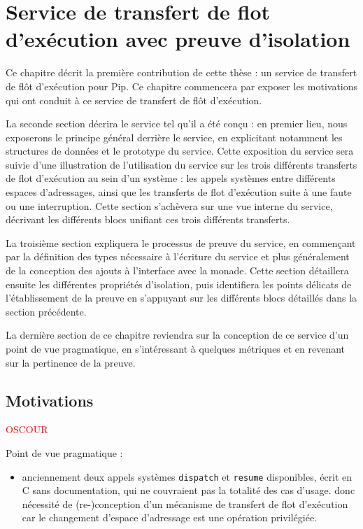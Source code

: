 \chapter{Service de transfert de flot d'exécution avec preuve d'isolation}

Ce chapitre décrit la première contribution de cette thèse : un service de transfert de flôt d'exécution pour Pip. Ce chapitre commencera par exposer les motivations qui ont conduit à ce service de transfert de flôt d'exécution.

La seconde section décrira le service tel qu'il a été conçu : en premier lieu, nous exposerons le principe général derrière le service, en explicitant notamment les structures de données et le prototype du service. Cette exposition du service sera suivie d'une illustration de l'utilisation du service sur les trois différents transferts de flot d'exécution au sein d'un système : les appels systèmes entre différents espaces d'adressages, ainsi que les transferts de flot d'exécution suite à une faute ou une interruption. Cette section s'achèvera sur une vue interne du service, décrivant les différents blocs unifiant ces trois différents transferts.

La troisième section expliquera le processus de preuve du service, en commençant par la définition des types nécessaire à l'écriture du service et plus généralement de la conception des ajouts à l'interface avec la monade. Cette section détaillera ensuite les différentes propriétés d'isolation, puis identifiera les points délicats de l'établissement de la preuve en s'appuyant sur les différents blocs détaillés dans la section précédente.

La dernière section de ce chapitre reviendra sur la conception de ce service d'un point de vue pragmatique, en s'intéressant à quelques métriques et en revenant sur la pertinence de la preuve.


	\section{Motivations}

		{\Huge \textcolor{red}{OSCOUR}}

		Point de vue pragmatique :
		\begin{itemize}
			\item anciennement deux appels systèmes \texttt{dispatch} et \texttt{resume} disponibles, écrit en C sans documentation, qui ne couvraient pas la totalité des cas d'usage.
			  donc nécessité de (re-)conception d'un mécanisme de transfert de flot d'exécution car le changement d'espace d'adressage est une opération privilégiée.
		\end{itemize}

